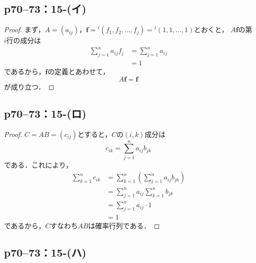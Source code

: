 \documentclass[a4paper,10pt,fleqn]{ltjsarticle}
\begin{document}
\subsection*{p70--73：15-(イ)}
\begin{leftbar}
  \begin{proof}
    まず，$A=(a_{ij})$，$\bm{f} = {}^t (f_1 , f_2,\dots,f_j) ={}^t (1,1,\dots,1)$とおくと，
    $A \bm{f}$の第$i$行の成分は
    \begin{align*}
      \sum_{j=1}^{n} a_{ij} f_j & = \sum_{j=1}^{n} a_{ij} \\
                                & =1
    \end{align*}
    であるから，$\bm{f}$の定義とあわせて，
    \[
      A \bm{f} =\bm{f}
    \]
    が成り立つ．
  \end{proof}
\end{leftbar}


\subsection*{p70--73：15-(ロ)}

\begin{tleftbar}
  \begin{proof}
    $C =AB=(c_{ij})$とすると，$C$の$(i,k)$成分は
    \[
      c_{ik}  =\sum_{j=1}^{n} a_{ij} b_{jk}
    \]
    である．これにより，
    \begin{align*}
      \sum_{k=1}^{n} c_{ik} & = \sum_{k=1}^{n} \left (\sum_{j=1}^{n} a_{ij} b_{jk}\right) \\
                            & = \sum_{j=1}^{n} a_{ij} \sum_{k=1}^{n} b_{jk}               \\
                            & = \sum_{j=1}^{n} a_{ij} \cdot 1                             \\
                            & = 1
    \end{align*}
    であるから，$C$すなわち$AB$は確率行列である．
  \end{proof}
\end{tleftbar}

\subsection*{p70--73：15-(ハ)}
\end{document}
